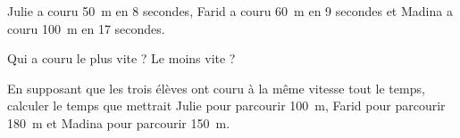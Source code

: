 \par Julie a couru 50~m en 8 secondes, Farid a couru 60~m en 9 secondes et Madina a couru 100~m en 17 secondes.
\begin{myenumerate}
   \item Qui a couru le plus vite ? Le moins vite ?
   \item En supposant que les trois élèves ont couru à la même vitesse tout le temps, calculer le temps que mettrait Julie pour parcourir 100~m, Farid pour parcourir 180~m et Madina pour parcourir 150~m.
\end{myenumerate}